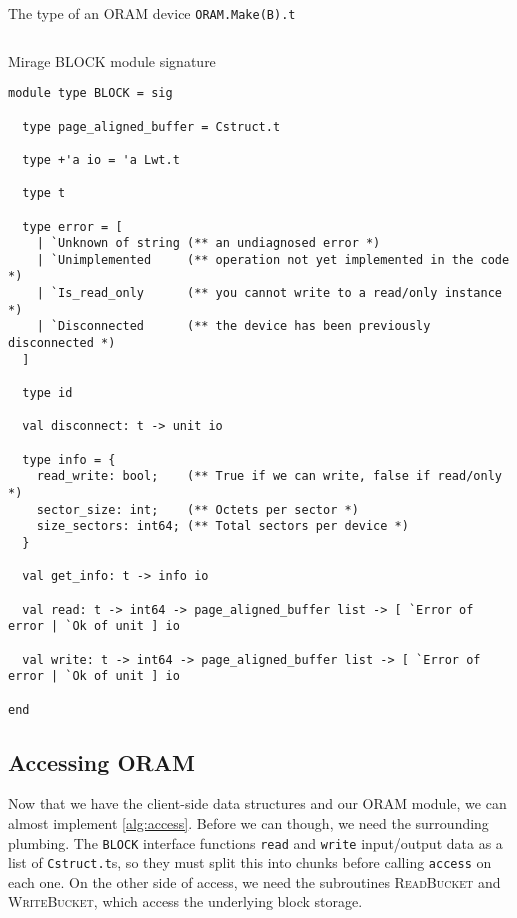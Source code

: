 \documentclass[12pt,a4paper,twoside,openright]{report}
\begin{document}
\begin{listing}[h]
\caption{The type of an ORAM device \texttt{ORAM.Make(B).t}}
\label{lst:orammaketype}
\inputminted[firstline=27, lastline=58]{ocaml}{../mirage-oram/lib/oram.ml}
\end{listing}


\begin{listing}
\caption{Mirage BLOCK module signature}
\label{lst:blocksig}
\vskip 10pt
\begin{verbatim}
module type BLOCK = sig

  type page_aligned_buffer = Cstruct.t

  type +'a io = 'a Lwt.t

  type t

  type error = [
    | `Unknown of string (** an undiagnosed error *)
    | `Unimplemented     (** operation not yet implemented in the code *)
    | `Is_read_only      (** you cannot write to a read/only instance *)
    | `Disconnected      (** the device has been previously disconnected *)
  ]

  type id

  val disconnect: t -> unit io

  type info = {
    read_write: bool;    (** True if we can write, false if read/only *)
    sector_size: int;    (** Octets per sector *)
    size_sectors: int64; (** Total sectors per device *)
  }

  val get_info: t -> info io

  val read: t -> int64 -> page_aligned_buffer list -> [ `Error of error | `Ok of unit ] io

  val write: t -> int64 -> page_aligned_buffer list -> [ `Error of error | `Ok of unit ] io

end
\end{verbatim}
\end{listing}

\subsection{Accessing ORAM}

Now that we have the client-side data structures and our ORAM module, we can almost implement \cref{alg:access}. Before we can though, we need the surrounding plumbing. The \texttt{BLOCK} interface functions \texttt{read} and \texttt{write} input/output data as a list of \texttt{Cstruct.t}s, so they must split this into chunks before calling \texttt{access} on each one. On the other side of access, we need the subroutines \textsc{ReadBucket} and \textsc{WriteBucket}, which access the underlying block storage.
\end{document}
